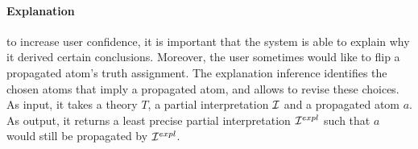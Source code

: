 \paragraph{Explanation} to increase user confidence, it is important that the system is able to explain why it derived certain conclusions. 
Moreover, the user sometimes would like to flip a propagated atom's truth assignment.
%
The explanation inference identifies the chosen atoms that imply a propagated atom, and allows to revise these choices.
As input, it takes a theory $T$, a partial interpretation $\mathcal{I}$ and a propagated atom $a$. %
As output, it returns a least precise partial interpretation $\mathcal{I}^{expl}$ such that $a$ would still be propagated by $\mathcal{I}^{expl}$.
